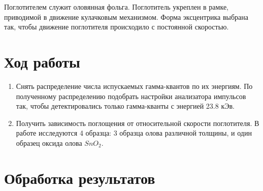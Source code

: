 \documentclass[12pt,a4paper]{article}
\begin{document}
Поглотителем служит оловянная фольга. Поглотитель укреплен в рамке, приводимой в движение кулачковым механизмом. Форма эксцентрика выбрана так, чтобы движение поглотителя происходило с постоянной скоростью.

\section{Ход работы} 

\begin{enumerate}

\item Снять распределение числа испускаемых гамма-квантов по их энергиям. По полученному распределению подобрать настройки анализатора импульсов так, чтобы детектировались только гамма-кванты с энергией 23.8 кЭв.

\item Получить зависимость поглощения от относительной скорости поглотителя. В работе исследуются 4 образца: 3 образца олова различной толщины, и один образец оксида олова $SnO_2$.

\end{enumerate}

\section{Обработка результатов}
\end{document}
